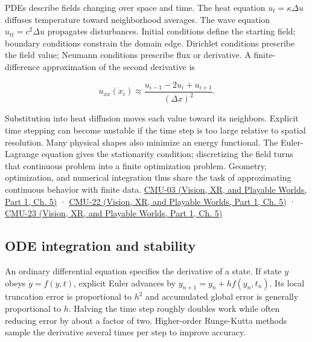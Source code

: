 PDEs describe fields changing over space and time. The heat equation \(u_t=\kappa\Delta u\) diffuses temperature toward neighborhood averages. The wave equation \(u_{tt}=c^2\Delta u\) propagates disturbances. Initial conditions define the starting field; boundary conditions constrain the domain edge. Dirichlet conditions prescribe the field value; Neumann conditions prescribe flux or derivative. A finite-difference approximation of the second derivative is

\[
u_{xx}(x_i)\approx\frac{u_{i-1}-2u_i+u_{i+1}}{(\Delta x)^2}.
\]

Substitution into heat diffusion moves each value toward its neighbors. Explicit time stepping can become unstable if the time step is too large relative to spatial resolution. Many physical shapes also minimize an energy functional. The Euler-Lagrange equation gives the stationarity condition; discretizing the field turns that continuous problem into a finite optimization problem. Geometry, optimization, and numerical integration thus share the task of approximating continuous behavior with finite data. \href{../07-Vision-XR-and-Playable-Worlds-P01/main.pdf\#nameddest=04-visual-computing-ii-ch036-cmu-03---vector-calculus-preview}{CMU-03 (Vision, XR, and Playable Worlds, Part 1, Ch. 5)} · \href{../07-Vision-XR-and-Playable-Worlds-P01/main.pdf\#nameddest=04-visual-computing-ii-ch036-cmu-22---optimization}{CMU-22 (Vision, XR, and Playable Worlds, Part 1, Ch. 5)} · \href{../07-Vision-XR-and-Playable-Worlds-P01/main.pdf\#nameddest=04-visual-computing-ii-ch036-cmu-23---physically-based-animation-and-pdes}{CMU-23 (Vision, XR, and Playable Worlds, Part 1, Ch. 5)}

\subsection{ODE integration and stability}\label{04-visual-computing-ii-ch029-ode-integration-and-stability}

\hypertarget{04-visual-computing-ii-ch029-ode-integration-and-stability}{}

An ordinary differential equation specifies the derivative of a state. If state \(y\) obeys \(\dot y=f(y,t)\), explicit Euler advances by \(y_{n+1}=y_n+h f(y_n,t_n)\). Its local truncation error is proportional to \(h^2\) and accumulated global error is generally proportional to \(h\). Halving the time step roughly doubles work while often reducing error by about a factor of two. Higher-order Runge-Kutta methods sample the derivative several times per step to improve accuracy.

